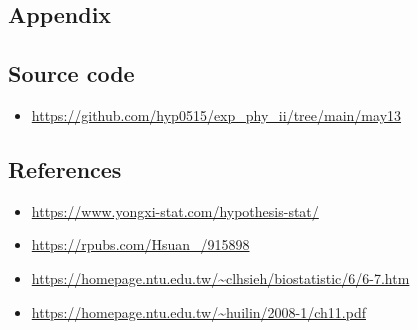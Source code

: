 \documentclass[12pt,a4paper]{article}
\begin{document}
\begin{CJK}{UTF8}{bkai}
\section{Appendix}

\subsection{Source code}

\begin{itemize}
    \item \url{https://github.com/hyp0515/exp_phy_ii/tree/main/may13}
\end{itemize}

\subsection{References}
\begin{itemize}
    \item \url{https://www.yongxi-stat.com/hypothesis-stat/}
    \item \url{https://rpubs.com/Hsuan_/915898}
    \item \url{https://homepage.ntu.edu.tw/~clhsieh/biostatistic/6/6-7.htm}
    \item \url{https://homepage.ntu.edu.tw/~huilin/2008-1/ch11.pdf}
\end{itemize}
\end{CJK}
\end{document}
